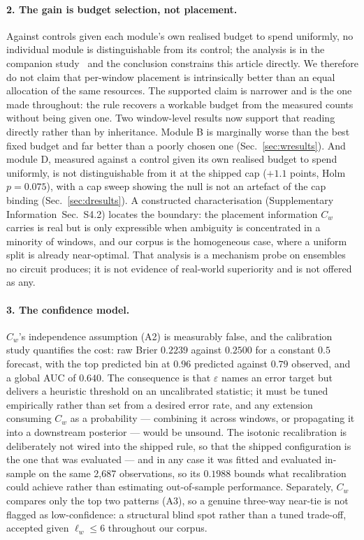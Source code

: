 \documentclass[final,5p,times,longtitle]{elsarticle}
\newcommand{\SI}{Supplementary Information}
\newcommand{\SIfamilyB}{\SI{}~Sec.~S4.2}
\newcommand{\Cw}{C_w}
\begin{document}
\paragraph{2. The gain is budget selection, not placement.}
Against controls given each module's own realised budget to spend
uniformly, no individual module is distinguishable from its control; the
analysis is in the companion study~\cite{companion} and the conclusion
constrains this article directly. We therefore do not claim that per-window
placement is intrinsically better than an equal allocation of the same
resources. The supported claim is narrower and is the one made throughout:
the rule recovers a workable budget from the measured counts without being
given one. Two window-level results now support that reading directly
rather than by inheritance. Module B is marginally worse than the best
fixed budget and far better than a poorly chosen one
(Sec.~\ref{sec:wresults}). And module D, measured against a control given
its own realised budget to spend uniformly, is not distinguishable from it
at the shipped cap ($+1.1$ points, Holm $p=0.075$), with a cap sweep
showing the null is not an artefact of the cap binding
(Sec.~\ref{sec:dresults}). A constructed characterisation (\SIfamilyB{})
locates the boundary: the placement information $\Cw$ carries is real but
is only expressible when ambiguity is concentrated in a minority of
windows, and our corpus is the homogeneous case, where a uniform split is
already near-optimal. That analysis is a mechanism probe on ensembles no
circuit produces; it is not evidence of real-world superiority and is not
offered as any.

\paragraph{3. The confidence model.}
$\Cw$'s independence assumption (A2) is measurably false, and the
calibration study quantifies the cost: raw Brier $0.2239$ against $0.2500$
for a constant $0.5$ forecast, with the top predicted bin at $0.96$
predicted against $0.79$ observed, and a global AUC of $0.640$. The
consequence is that $\varepsilon$ names an error target but delivers a
heuristic threshold on an uncalibrated statistic; it must be tuned
empirically rather than set from a desired error rate, and any extension
consuming $\Cw$ as a probability --- combining it across windows, or
propagating it into a downstream posterior --- would be unsound. The
isotonic recalibration is deliberately not wired into the shipped rule, so
that the shipped configuration is the one that was evaluated --- and in any
case it was fitted and evaluated in-sample on the same 2{,}687
observations, so its $0.1988$ bounds what recalibration could achieve
rather than estimating out-of-sample performance. Separately, $\Cw$
compares only the top two patterns (A3), so a genuine three-way near-tie is
not flagged as low-confidence: a structural blind spot rather than a tuned
trade-off, accepted given $\ell_w\le6$ throughout our corpus.
\end{document}
